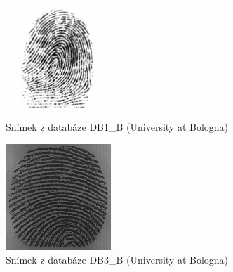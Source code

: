  \begin{figure}[htbp]
  \begin{minipage}[b]{0.5\linewidth}
    \centering
    \includegraphics[width=150]{obrazky-figures/db3.png}
    \caption{Snímek z databáze DB1\_B (University at Bologna)}
    \label{fig:normimg105}
  \end{minipage}
  \hspace{0.3cm}
  \begin{minipage}[b]{0.5\linewidth}
    \centering
    \includegraphics[width=150]{obrazky-figures/db2.png}
    \caption{Snímek z databáze DB3\_B (University at Bologna)}
    \label{fig:mask}
  \end{minipage}
\end{figure}
